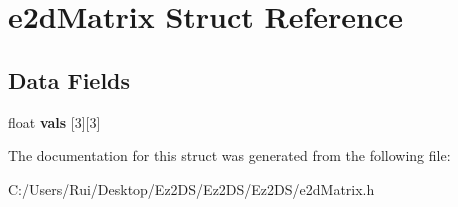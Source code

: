 \hypertarget{structe2d_matrix}{\section{e2d\-Matrix Struct Reference}
\label{structe2d_matrix}
}
\subsection*{Data Fields}
\begin{DoxyCompactItemize}
\item 
\hypertarget{structe2d_matrix_ac06a92ccf2617d904678c51c6cf5a9bb}{float {\bfseries vals} \mbox{[}3\mbox{]}\mbox{[}3\mbox{]}}\label{structe2d_matrix_ac06a92ccf2617d904678c51c6cf5a9bb}

\end{DoxyCompactItemize}


The documentation for this struct was generated from the following file\-:\begin{DoxyCompactItemize}
\item 
C\-:/\-Users/\-Rui/\-Desktop/\-Ez2\-D\-S/\-Ez2\-D\-S/\-Ez2\-D\-S/e2d\-Matrix.\-h\end{DoxyCompactItemize}
